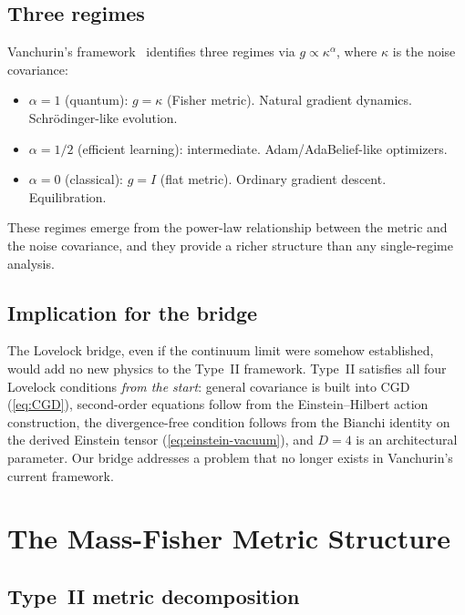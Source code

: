 \documentclass[11pt]{article}
\theoremstyle{definition}
\theoremstyle{remark}
\begin{document}
\subsection{Three regimes}
\label{sec:three-regimes}

Vanchurin's framework~\cite{Vanchurin2025} identifies three regimes via
$g \propto \kappa^\alpha$, where $\kappa$ is the noise covariance:
\begin{itemize}
\item $\alpha = 1$ (quantum): $g = \kappa$ (Fisher metric). Natural
  gradient dynamics.  Schr\"odinger-like evolution.
\item $\alpha = 1/2$ (efficient learning): intermediate.
  Adam/AdaBelief-like optimizers.
\item $\alpha = 0$ (classical): $g = I$ (flat metric). Ordinary gradient
  descent. Equilibration.
\end{itemize}
These regimes emerge from the power-law relationship between the metric
and the noise covariance, and they provide a richer structure than any
single-regime analysis.

\subsection{Implication for the bridge}
\label{sec:bridge-implication}

The Lovelock bridge, even if the continuum limit were somehow established,
would add no new physics to the Type~II framework.
Type~II satisfies all four Lovelock conditions \emph{from the start}:
general covariance is built into CGD (\cref{eq:CGD}),
second-order equations follow from the Einstein--Hilbert action
construction, the divergence-free condition follows from the Bianchi
identity on the derived Einstein tensor (\cref{eq:einstein-vacuum}), and
$D = 4$ is an architectural parameter.
Our bridge addresses a problem that no longer exists in Vanchurin's
current framework.

\section{The Mass-Fisher Metric Structure}
\label{sec:mass-fisher}

\subsection{Type~II metric decomposition}
\label{sec:metric-decomposition}
\end{document}
